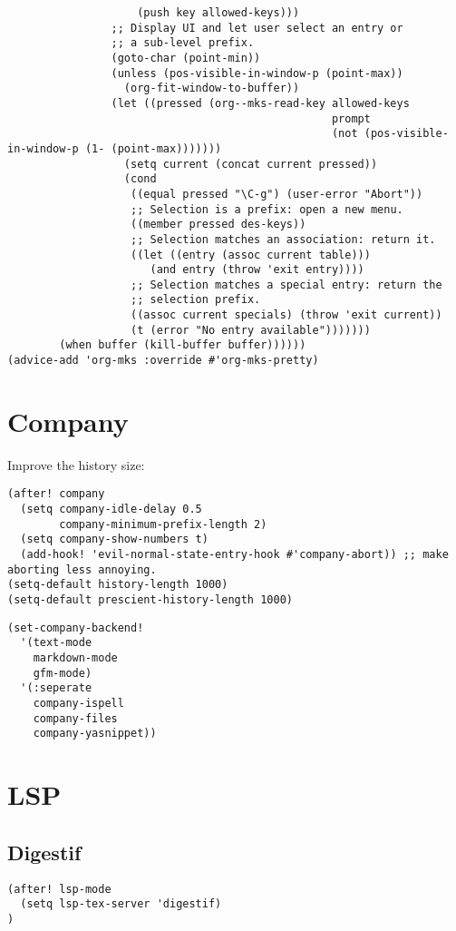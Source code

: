 \documentclass[c]{article}
\theoremstyle{plain}%
\theoremstyle{definition}
\theoremstyle{remark}
\begin{document}
\begin{verbatim}
                    (push key allowed-keys)))
                ;; Display UI and let user select an entry or
                ;; a sub-level prefix.
                (goto-char (point-min))
                (unless (pos-visible-in-window-p (point-max))
                  (org-fit-window-to-buffer))
                (let ((pressed (org--mks-read-key allowed-keys
                                                  prompt
                                                  (not (pos-visible-in-window-p (1- (point-max)))))))
                  (setq current (concat current pressed))
                  (cond
                   ((equal pressed "\C-g") (user-error "Abort"))
                   ;; Selection is a prefix: open a new menu.
                   ((member pressed des-keys))
                   ;; Selection matches an association: return it.
                   ((let ((entry (assoc current table)))
                      (and entry (throw 'exit entry))))
                   ;; Selection matches a special entry: return the
                   ;; selection prefix.
                   ((assoc current specials) (throw 'exit current))
                   (t (error "No entry available")))))))
        (when buffer (kill-buffer buffer))))))
(advice-add 'org-mks :override #'org-mks-pretty)
\end{verbatim}
\section{Company}
\label{sec:org0177653}
Improve the history size:
\begin{verbatim}
(after! company
  (setq company-idle-delay 0.5
        company-minimum-prefix-length 2)
  (setq company-show-numbers t)
  (add-hook! 'evil-normal-state-entry-hook #'company-abort)) ;; make aborting less annoying.
(setq-default history-length 1000)
(setq-default prescient-history-length 1000)
\end{verbatim}
\begin{verbatim}
(set-company-backend!
  '(text-mode
    markdown-mode
    gfm-mode)
  '(:seperate
    company-ispell
    company-files
    company-yasnippet))
\end{verbatim}
\section{LSP}
\label{sec:orga6c5624}
\subsection{Digestif}
\label{sec:orga8b424c}
\begin{verbatim}
(after! lsp-mode
  (setq lsp-tex-server 'digestif)
)
\end{verbatim}
\end{document}
